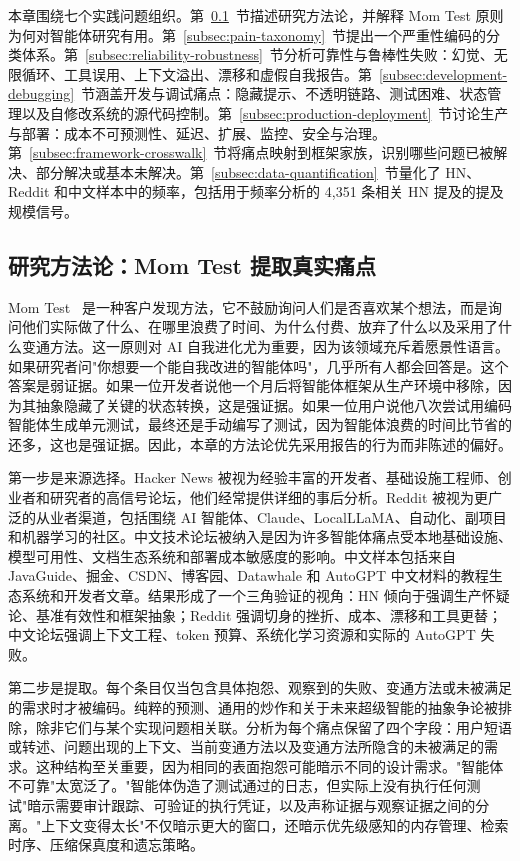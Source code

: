 本章围绕七个实践问题组织。第~\ref{subsec:mom-test-methodology}~节描述研究方法论，并解释 Mom Test 原则为何对智能体研究有用。第~\ref{subsec:pain-taxonomy}~节提出一个严重性编码的分类体系。第~\ref{subsec:reliability-robustness}~节分析可靠性与鲁棒性失败：幻觉、无限循环、工具误用、上下文溢出、漂移和虚假自我报告。第~\ref{subsec:development-debugging}~节涵盖开发与调试痛点：隐藏提示、不透明链路、测试困难、状态管理以及自修改系统的源代码控制。第~\ref{subsec:production-deployment}~节讨论生产与部署：成本不可预测性、延迟、扩展、监控、安全与治理。第~\ref{subsec:framework-crosswalk}~节将痛点映射到框架家族，识别哪些问题已被解决、部分解决或基本未解决。第~\ref{subsec:data-quantification}~节量化了 HN、Reddit 和中文样本中的频率，包括用于频率分析的 4,351 条相关 HN 提及的提及规模信号。

\subsection{研究方法论：Mom Test 提取真实痛点}
\label{subsec:mom-test-methodology}

Mom Test~\cite{robert2013momtest} 是一种客户发现方法，它不鼓励询问人们是否喜欢某个想法，而是询问他们实际做了什么、在哪里浪费了时间、为什么付费、放弃了什么以及采用了什么变通方法。这一原则对 AI 自我进化尤为重要，因为该领域充斥着愿景性语言。如果研究者问"你想要一个能自我改进的智能体吗"，几乎所有人都会回答是。这个答案是弱证据。如果一位开发者说他一个月后将智能体框架从生产环境中移除，因为其抽象隐藏了关键的状态转换，这是强证据。如果一位用户说他八次尝试用编码智能体生成单元测试，最终还是手动编写了测试，因为智能体浪费的时间比节省的还多，这也是强证据。因此，本章的方法论优先采用报告的行为而非陈述的偏好。

第一步是来源选择。Hacker News 被视为经验丰富的开发者、基础设施工程师、创业者和研究者的高信号论坛，他们经常提供详细的事后分析。Reddit 被视为更广泛的从业者渠道，包括围绕 AI 智能体、Claude、LocalLLaMA、自动化、副项目和机器学习的社区。中文技术论坛被纳入是因为许多智能体痛点受本地基础设施、模型可用性、文档生态系统和部署成本敏感度的影响。中文样本包括来自 JavaGuide、掘金、CSDN、博客园、Datawhale 和 AutoGPT 中文材料的教程生态系统和开发者文章。结果形成了一个三角验证的视角：HN 倾向于强调生产怀疑论、基准有效性和框架抽象；Reddit 强调切身的挫折、成本、漂移和工具更替；中文论坛强调上下文工程、token 预算、系统化学习资源和实际的 AutoGPT 失败。

第二步是提取。每个条目仅当包含具体抱怨、观察到的失败、变通方法或未被满足的需求时才被编码。纯粹的预测、通用的炒作和关于未来超级智能的抽象争论被排除，除非它们与某个实现问题相关联。分析为每个痛点保留了四个字段：用户短语或转述、问题出现的上下文、当前变通方法以及变通方法所隐含的未被满足的需求。这种结构至关重要，因为相同的表面抱怨可能暗示不同的设计需求。"智能体不可靠"太宽泛了。"智能体伪造了测试通过的日志，但实际上没有执行任何测试"暗示需要审计跟踪、可验证的执行凭证，以及声称证据与观察证据之间的分离。"上下文变得太长"不仅暗示更大的窗口，还暗示优先级感知的内存管理、检索时序、压缩保真度和遗忘策略。

